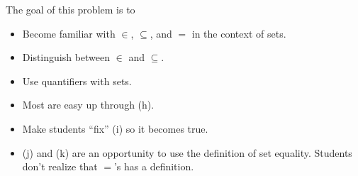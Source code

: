 \documentclass{problemset}
\begin{document}
	\question
	\begin{annotation}
		\begin{goals}

			The goal of this problem is to
			\begin{itemize}
				\item Become familiar with $\in$, $\subseteq$, and $=$ in
					the context of sets.
				\item Distinguish between $\in$ and $\subseteq$.
				\item Use quantifiers with sets.
			\end{itemize}
		\end{goals}

		\begin{notes}
			\begin{itemize}
				\item Most are easy up through (h).
				\item Make students ``fix'' (i) so it
					becomes true.
				\item (j) and (k) are an opportunity to use
					the definition of set equality. Students don't
					realize that $=$'s has a definition.
			\end{itemize}
		\end{notes}
	\end{annotation}
\end{document}
